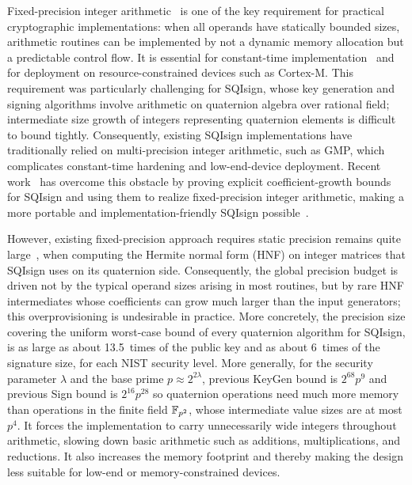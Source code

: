 Fixed-precision integer arithmetic~\cite{Yat09} is one of the key requirement for practical cryptographic implementations:
when all operands have statically bounded sizes, arithmetic routines can be implemented by not a dynamic memory allocation but a predictable control flow.
It is essential for constant-time implementation~\cite{ABB+16} and for deployment on resource-constrained devices such as Cortex-M.
This requirement was particularly challenging for SQIsign, whose key generation and signing algorithms involve arithmetic on quaternion algebra over rational field; intermediate size growth of integers representing quaternion elements is difficult to bound tightly.
Consequently, existing SQIsign implementations have traditionally relied on multi-precision integer arithmetic, such as GMP, which complicates constant-time hardening and low-end-device deployment.
Recent work~\cite{KLKL25} has overcome this obstacle by proving explicit coefficient-growth bounds for SQIsign and using them to realize fixed-precision integer arithmetic, making a more portable and implementation-friendly SQIsign possible~\cite{BHJ+25}.

However, existing fixed-precision approach requires static precision remains quite large~\cite{KLKL25,BHJ+25,Ler26}, when computing the Hermite normal form (HNF) on integer matrices that SQIsign uses on its quaternion side.
Consequently, the global precision budget is driven not by the typical operand sizes arising in most routines, but by rare HNF intermediates whose coefficients can grow much larger than the input generators;
this overprovisioning is undesirable in practice.
More concretely, the precision size covering the uniform worst-case bound of every quaternion algorithm for SQIsign, is as large as about 13.5~times of the public key and as about 6~times of the signature size, for each NIST security level.
More generally, for the security parameter $\lambda$ and the base prime $p\approx2^{2\lambda}$, previous KeyGen bound is $2^{68}p^9$ and previous Sign bound is $2^{16}p^{28}$ so quaternion operations need much more memory than operations in the finite field $\mathbb{F}_{p^2}$, whose intermediate value sizes are at most $p^4$.
It forces the implementation to carry unnecessarily wide integers throughout arithmetic, slowing down basic arithmetic such as additions, multiplications, and reductions.
It also increases the memory footprint and thereby making the design less suitable for low-end or memory-constrained devices.

